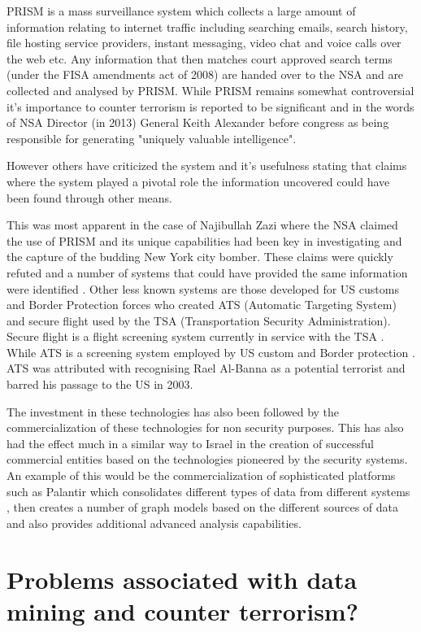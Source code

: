 PRISM is a mass surveillance system which collects a large amount of information relating to internet traffic including searching emails, search history, file hosting service providers, instant messaging, video chat and voice calls over the web etc. Any information that then matches court approved search terms (under the FISA amendments act of 2008) are handed over to the NSA and are collected and analysed by PRISM. While PRISM remains somewhat controversial it's importance to counter terrorism is reported to be significant and in the words of NSA Director (in 2013) General Keith Alexander before congress as being responsible for generating "uniquely valuable intelligence". 

However others have criticized the system and it's usefulness stating that claims where the system played a pivotal role the information uncovered could have been found through other means. 

This was most apparent in the case of Najibullah Zazi where the NSA claimed the use of PRISM and its unique capabilities had been key in investigating and the capture of the budding New York city bomber. These claims were quickly refuted and a number of systems that could have provided the same information were identified \citep{NSAAtlanticWire2013}. Other less known systems are those developed for US customs and Border Protection forces who created ATS (Automatic Targeting System) and secure flight used by the TSA (Transportation Security Administration). Secure flight is a flight screening system currently in service with the TSA \citep{spear2015secure}. While ATS is a screening system employed by US custom and Border protection \citep{jizba2015analysis}. ATS was attributed with recognising Rael Al-Banna as a potential terrorist and barred his passage to the US in 2003.

The investment in these technologies has also been followed by the commercialization of these technologies for non security purposes. This has also had the effect much in a similar way to Israel in the creation of successful commercial entities based on the technologies pioneered by the security systems.  An example of this would be the commercialization of sophisticated platforms such as Palantir which consolidates different types of data from different systems \citep{soklakova2016technological}, then creates a number of graph models based on the different sources of data and also provides additional advanced analysis capabilities.

\section{Problems associated with data mining and counter terrorism?}

